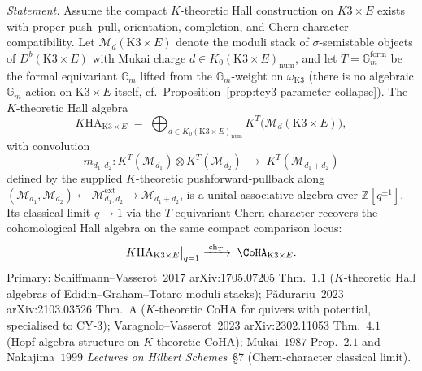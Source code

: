 \begin{proposition}
\label{prop:tcy3-kha-k3xe}
\emph{Statement.} Assume the compact $K$-theoretic Hall construction on
$K3\times E$ exists with proper push--pull, orientation, completion,
and Chern-character compatibility. Let
$\mathcal{M}_d(\mathrm{K3}\times E)$ denote the
moduli stack of $\sigma$-semistable objects of $D^b(\mathrm{K3}\times E)$
with Mukai charge $d \in K_0(\mathrm{K3}\times E)_{\mathrm{num}}$, and
let $T = \mathbb{G}_m^{\mathrm{form}}$ be the formal equivariant
$\mathbb{G}_m$ lifted from the $\mathbb{G}_m$-weight on
$\omega_{\mathrm{K3}}$ (there is no algebraic $\mathbb{G}_m$-action on
$\mathrm{K3}\times E$ itself, cf.\ Proposition~\ref{prop:tcy3-parameter-collapse}).
The $K$-theoretic Hall algebra
\[
 K\mathrm{HA}_{\mathrm{K3}\times E}
 \;=\;
 \bigoplus_{d \in K_0(\mathrm{K3}\times E)_{\mathrm{num}}}
 K^T\bigl(\mathcal{M}_d(\mathrm{K3}\times E)\bigr),
\]
with convolution
\[
 m_{d_1, d_2} :
 K^T(\mathcal{M}_{d_1})\otimes K^T(\mathcal{M}_{d_2})
 \;\longrightarrow\;
 K^T(\mathcal{M}_{d_1 + d_2})
\]
defined by the supplied $K$-theoretic pushforward-pullback along
$(\mathcal{M}_{d_1}, \mathcal{M}_{d_2}) \leftarrow
\mathcal{M}_{d_1, d_2}^{\mathrm{ext}} \to \mathcal{M}_{d_1 + d_2}$,
is a unital associative algebra over $\mathbb Z[q^{\pm 1}]$. Its
classical limit $q \to 1$ via the $T$-equivariant Chern character
recovers the cohomological Hall algebra on the same compact comparison
locus:
\[
 K\mathrm{HA}_{\mathrm{K3}\times E}\bigl|_{q = 1}
 \;\xrightarrow{\;\mathrm{ch}_T\;}\;
 \CoHA_{\mathrm{K3}\times E}.
\]
Primary: Schiffmann--Vasserot~$2017$ arXiv:1705.07205 Thm.\ $1.1$
($K$-theoretic Hall algebras of Edidin--Graham--Totaro
moduli stacks); P\u{a}durariu~$2023$ arXiv:2103.03526 Thm.\ A
($K$-theoretic CoHA for quivers with potential, specialised to
CY-$3$); Varagnolo--Vasserot~$2023$ arXiv:2302.11053 Thm.\ $4.1$
(Hopf-algebra structure on $K$-theoretic CoHA); Mukai~$1987$ Prop.\ $2.1$
and Nakajima~$1999$ \emph{Lectures on Hilbert Schemes}~\S 7
(Chern-character classical limit).
\end{proposition}

